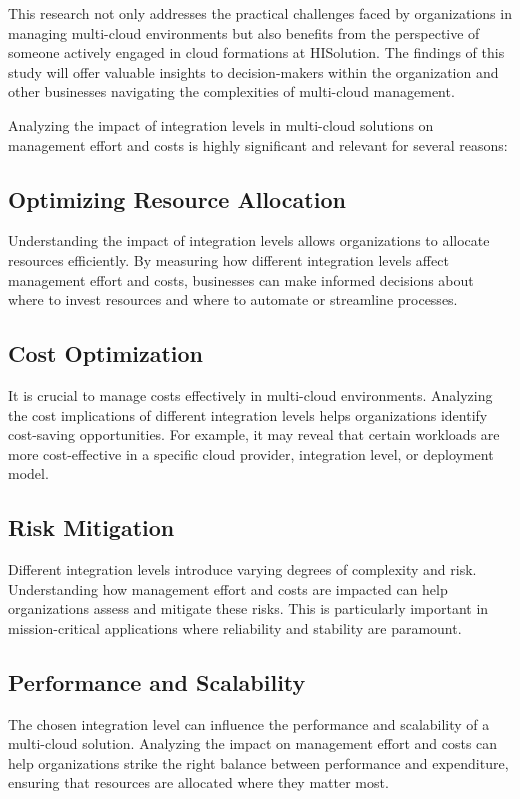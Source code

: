 This research not only addresses the practical challenges faced by organizations in managing multi-cloud environments 
but also benefits from the perspective of someone actively engaged in cloud formations at HISolution. 
The findings of this study will offer valuable insights to decision-makers within the organization 
and other businesses navigating the complexities of multi-cloud management. 

Analyzing the impact of integration levels in multi-cloud solutions on management effort and costs is highly significant and relevant for several reasons:

\subsection*{Optimizing Resource Allocation}
Understanding the impact of integration levels allows organizations to allocate resources efficiently. 
By measuring how different integration levels affect management effort and costs, 
businesses can make informed decisions about where to invest resources and where to automate or streamline processes.

\subsection*{Cost Optimization}
It is crucial to manage costs effectively in multi-cloud environments.
Analyzing the cost implications of different integration levels helps organizations identify cost-saving opportunities. 
For example, it may reveal that certain workloads are more cost-effective in a specific cloud provider, integration level, or deployment model.

\subsection*{Risk Mitigation}
Different integration levels introduce varying degrees of complexity and risk. 
Understanding how management effort and costs are impacted can help organizations assess and mitigate these risks. 
This is particularly important in mission-critical applications where reliability and stability are paramount.

\subsection*{Performance and Scalability}
The chosen integration level can influence the performance and scalability of a multi-cloud solution. 
Analyzing the impact on management effort and costs can help organizations strike the right balance between performance and expenditure, 
ensuring that resources are allocated where they matter most.

